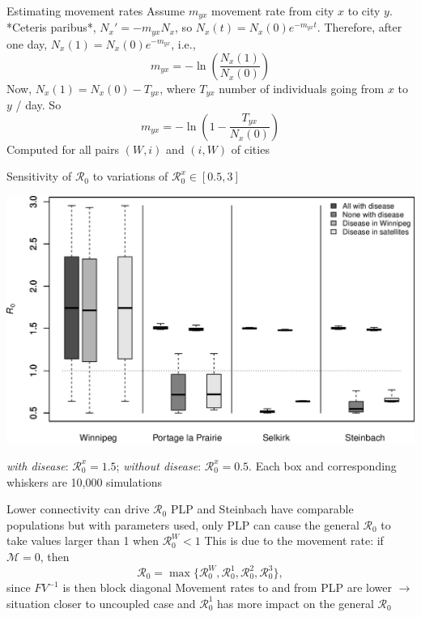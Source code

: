 \documentclass[aspectratio=169]{beamer}\usepackage[]{graphicx}\usepackage[]{xcolor}
\begin{document}
\begin{frame}{Estimating movement rates}
	Assume $m_{yx}$ movement rate from city $x$ to city $y$. *Ceteris paribus*, $N_x'=-m_{yx}N_x$, so $N_x(t)=N_x(0)e^{-m_{yx}t}$. Therefore, after one day, $N_x(1)=N_x(0)e^{-m_{yx}}$, i.e.,
	$$
	m_{yx}=-\ln\left(\frac{N_x(1)}{N_x(0)}\right)
	$$
	Now, $N_x(1)=N_x(0)-T_{yx}$, where $T_{yx}$ number of individuals going from $x$ to $y$ / day. So
	$$
	m_{yx}=-\ln\left(1-\frac{T_{yx}}{N_x(0)}\right)
	$$
	Computed for all pairs $(W,i)$ and $(i,W)$ of cities
\end{frame}
	
\begin{frame}{Sensitivity of $\mathcal{R}_0$ to variations of $\mathcal{R}_0^x\in[0.5,3]$}
\begin{center}
	\includegraphics[width=\textwidth]{FIGS/sensitivity_4cities}
\end{center}
\emph{with disease}: $\mathcal{R}_0^x=1.5$; \emph{without disease}: $\mathcal{R}_0^x=0.5$. Each box and corresponding whiskers are 10,000 simulations
\end{frame}

\begin{frame}{Lower connectivity can drive $\mathcal{R}_0$}
	PLP and Steinbach have comparable populations but with parameters used, only PLP can cause the general $\mathcal{R}_0$ to take values larger than 1 when $\mathcal{R}_0^W<1$
	\vfill
	This is due to the movement rate: if $\mathcal{M}=0$, then
	$$
	\mathcal{R}_0=\max\{\mathcal{R}_0^W,\mathcal{R}_0^1,\mathcal{R}_0^2,\mathcal{R}_0^3\},
	$$
	since $FV^{-1}$ is then block diagonal
	\vfill
	Movement rates to and from PLP are lower $\rightarrow$ situation closer to uncoupled case and $\mathcal{R}_0^1$ has more impact on the general $\mathcal{R}_0$
\end{frame}
\end{document}
